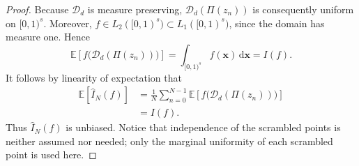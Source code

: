 \documentclass[11pt]{article}
\newcommand{\D}{\mathcal D}
\begin{document}
\begin{proof}
Because \(\D_d\) is measure preserving,
\(\D_d(\Pi(z_n))\) is consequently uniform on \([0,1)^s\).  Moreover,
\(f\in L_2([0,1)^s)\subset L_1([0,1)^s)\), since the domain has measure
one.  Hence
\[
  \mathbb E\!\left[
    f\bigl(\D_d(\Pi(z_n))\bigr)
  \right]
  =\int_{[0,1)^s}f(\boldsymbol x)\,\mathrm d\boldsymbol x
  =I(f).
\]
It follows by linearity of expectation that
\[
\begin{aligned}
  \mathbb E[\widehat I_N(f)]
  &=\frac1N\sum_{n=0}^{N-1}
      \mathbb E\!\left[
        f\bigl(\D_d(\Pi(z_n))\bigr)
      \right] \\
  &=I(f).
\end{aligned}
\]
Thus \(\widehat I_N(f)\) is unbiased.  Notice that independence of the
scrambled points is neither assumed nor needed; only the marginal
uniformity of each scrambled point is used here.


\end{proof}
\end{document}
